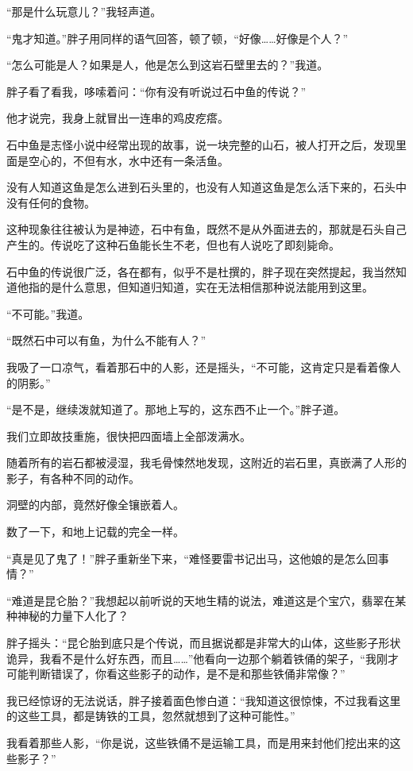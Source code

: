 “那是什么玩意儿？”我轻声道。

“鬼才知道。”胖子用同样的语气回答，顿了顿，“好像……好像是个人？”

“怎么可能是人？如果是人，他是怎么到这岩石壁里去的？”我道。

胖子看了看我，哆嗦着问：“你有没有听说过石中鱼的传说？”

他才说完，我身上就冒出一连串的鸡皮疙瘩。

石中鱼是志怪小说中经常出现的故事，说一块完整的山石，被人打开之后，发现里面是空心的，不但有水，水中还有一条活鱼。

没有人知道这鱼是怎么进到石头里的，也没有人知道这鱼是怎么活下来的，石头中没有任何的食物。

这种现象往往被认为是神迹，石中有鱼，既然不是从外面进去的，那就是石头自己产生的。传说吃了这种石鱼能长生不老，但也有人说吃了即刻毙命。

石中鱼的传说很广泛，各在都有，似乎不是杜撰的，胖子现在突然提起，我当然知道他指的是什么意思，但知道归知道，实在无法相信那种说法能用到这里。

“不可能。”我道。

“既然石中可以有鱼，为什么不能有人？”

我吸了一口凉气，看着那石中的人影，还是摇头，“不可能，这肯定只是看着像人的阴影。”

“是不是，继续泼就知道了。那地上写的，这东西不止一个。”胖子道。

我们立即故技重施，很快把四面墙上全部泼满水。

随着所有的岩石都被浸湿，我毛骨悚然地发现，这附近的岩石里，真嵌满了人形的影子，有各种不同的动作。

洞壁的内部，竟然好像全镶嵌着人。

数了一下，和地上记载的完全一样。

“真是见了鬼了！”胖子重新坐下来，“难怪要雷书记出马，这他娘的是怎么回事情？”

“难道是昆仑胎？”我想起以前听说的天地生精的说法，难道这是个宝穴，翡翠在某种神秘的力量下人化了？

胖子摇头：“昆仑胎到底只是个传说，而且据说都是非常大的山体，这些影子形状诡异，我看不是什么好东西，而且……”他看向一边那个躺着铁俑的架子，“我刚才可能判断错误了，你看这些影子的动作，是不是和那些铁俑非常像？”

我已经惊讶的无法说话，胖子接着面色惨白道：“我知道这很惊悚，不过我看这里的这些工具，都是铸铁的工具，忽然就想到了这种可能性。”

我看着那些人影，“你是说，这些铁俑不是运输工具，而是用来封他们挖出来的这些影子？”

